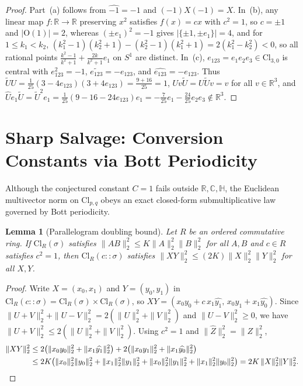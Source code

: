\documentclass[11pt]{article}
\newtheorem{lemma}[theorem]{Lemma}
\theoremstyle{definition}
\newcommand{\Cl}{\mathrm{Cl}}
\newcommand{\Orth}{\mathrm{O}}
\newcommand{\R}{\mathbb{R}}
\newcommand{\C}{\mathbb{C}}
\newcommand{\HH}{\mathbb{H}}
\begin{document}
\begin{proof}
Part~(a) follows from $\widehat{-1}=-1$ and $(-1)X(-1)=X$. In~(b), any linear map $f:\R\to\R$ preserving $x^2$ satisfies $f(x)=cx$ with $c^2=1$, so $c=\pm 1$ and $|\Orth(1)|=2$, whereas $(\pm e_1)^2=-1$ gives $|\{\pm 1,\pm e_1\}|=4$, and for $1\le k_1<k_2$, $(k_1^2-1)(k_2^2+1)-(k_2^2-1)(k_1^2+1)=2(k_1^2-k_2^2)<0$, so all rational points $\frac{k^2-1}{k^2+1}+\frac{2k}{k^2+1}e_1$ on $S^1$ are distinct. In~(c), $e_{123}=e_1e_2e_3\in\Cl_{3,0}$ is central with $e_{123}^2=-1$, $\widetilde{e_{123}}=-e_{123}$, and $\widehat{e_{123}}=-e_{123}$. Thus $\widetilde{U}U=\frac{1}{25}(3-4e_{123})(3+4e_{123})=\frac{9+16}{25}=1$, $Uv\widetilde{U}=U\widetilde{U}v=v$ for all $v\in\R^3$, and $\widehat{U}e_1\widetilde{U}=\widetilde{U}^2 e_1=\frac{1}{25}(9-16-24e_{123})e_1=-\frac{7}{25}e_1-\frac{24}{25}e_2e_3\notin\R^3$.
\end{proof}

\section{Sharp Salvage: Conversion Constants via Bott Periodicity}

Although the conjectured constant $C=1$ fails outside $\R,\C,\HH$, the Euclidean multivector norm on $\Cl_{p,q}$ obeys an exact closed-form submultiplicative law governed by Bott periodicity.

\begin{lemma}[Parallelogram doubling bound]\label{lem:doubling}
Let $R$ be an ordered commutative ring. If $\Cl_R(\sigma)$ satisfies $\|AB\|_2^2\le K\|A\|_2^2\|B\|_2^2$ for all $A,B$ and $c\in R$ satisfies $c^2=1$, then $\Cl_R(c::\sigma)$ satisfies $\|XY\|_2^2\le(2K)\|X\|_2^2\|Y\|_2^2$ for all $X,Y$.
\end{lemma}
\begin{proof}
Write $X=(x_0,x_1)$ and $Y=(y_0,y_1)$ in $\Cl_R(c::\sigma)=\Cl_R(\sigma)\times\Cl_R(\sigma)$, so $XY=(x_0y_0+c\,x_1\widehat{y_1},\,x_0y_1+x_1\widehat{y_0})$. Since $\|U+V\|_2^2+\|U-V\|_2^2=2(\|U\|_2^2+\|V\|_2^2)$ and $\|U-V\|_2^2\ge 0$, we have $\|U+V\|_2^2\le 2(\|U\|_2^2+\|V\|_2^2)$. Using $c^2=1$ and $\|\widehat{Z}\|_2^2=\|Z\|_2^2$,
\begin{align*}
  \|XY\|_2^2 &\le 2\bigl(\|x_0y_0\|_2^2+\|x_1\widehat{y_1}\|_2^2\bigr) + 2\bigl(\|x_0y_1\|_2^2+\|x_1\widehat{y_0}\|_2^2\bigr) \\
  &\le 2K\bigl(\|x_0\|_2^2\|y_0\|_2^2+\|x_1\|_2^2\|y_1\|_2^2+\|x_0\|_2^2\|y_1\|_2^2+\|x_1\|_2^2\|y_0\|_2^2\bigr) = 2K\,\|X\|_2^2\|Y\|_2^2.\qedhere
\end{align*}
\end{proof}
\end{document}
